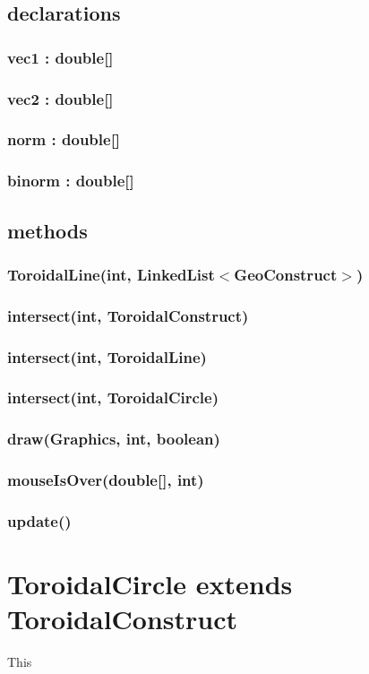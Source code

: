 \documentclass[a4paper,10pt]{report}
\begin{document}
\subsection{declarations}
\subsubsection{vec1 : double[]}
\subsubsection{vec2 : double[]}
\subsubsection{norm : double[]}
\subsubsection{binorm : double[]}
\subsection{methods}
\subsubsection{ToroidalLine(int, LinkedList$<$GeoConstruct$>$)}
\subsubsection{intersect(int, ToroidalConstruct)}
\subsubsection{intersect(int, ToroidalLine)}
\subsubsection{intersect(int, ToroidalCircle)}
\subsubsection{draw(Graphics, int, boolean)}
\subsubsection{mouseIsOver(double[], int)}
\subsubsection{update()}
\section{ToroidalCircle extends ToroidalConstruct} This
\end{document}
